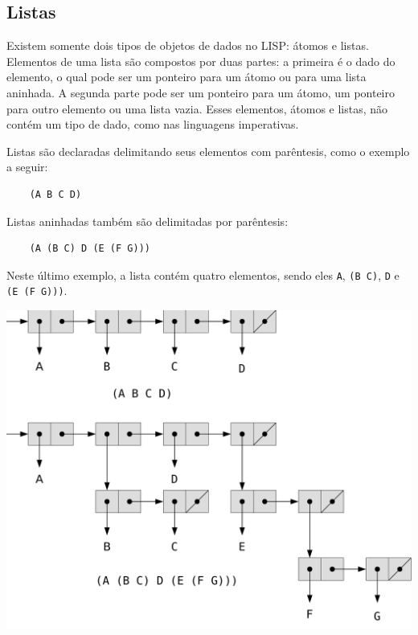 \documentclass[a4paper, twoside, 12pt]{article}
\begin{document}
\subsection{Listas}

Existem somente dois tipos de objetos de dados no LISP: átomos e listas. Elementos de uma lista são compostos por duas partes: a primeira é o dado do elemento, o qual pode ser um ponteiro para um átomo ou para uma lista aninhada. A segunda parte pode ser um ponteiro para um átomo, um ponteiro para outro elemento ou uma lista vazia. Esses elementos, átomos e listas, não contém um tipo de dado, como nas linguagens imperativas.

Listas são declaradas delimitando seus elementos com parêntesis, como o exemplo a seguir:

\begin{verbatim}
    (A B C D)
\end{verbatim}

Listas aninhadas também são delimitadas por parêntesis:

\begin{verbatim}
    (A (B C) D (E (F G)))
\end{verbatim}

Neste último exemplo, a lista contém quatro elementos, sendo eles \texttt{A}, \texttt{(B C)}, \texttt{D} e \texttt{(E (F G)))}.

\clearpage
\bigskip 
\begin{center}
\includegraphics[scale=0.50]{../listas.pdf}
\end{center}
\end{document}
